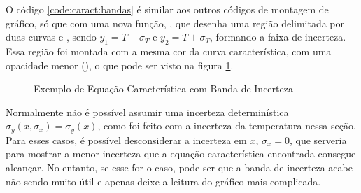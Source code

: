     O código \ref{code:caract:bandas} é similar aos outros códigos de montagem de gráfico, só que com uma nova função, , que desenha uma região delimitada por duas curvas  e , sendo $y_1 = T - \sigma_T$ e $y_2 = T + \sigma_T$, formando a faixa de incerteza. Essa região foi montada com a mesma cor da curva característica, com uma opacidade menor (), o que pode ser visto na figura \ref{fig:caract:bandas}.

    \begin{figure}[H]
        \centering
        

        \caption{Exemplo de Equação Característica com Banda de Incerteza}
        \label{fig:caract:bandas}
    \end{figure}

    \begin{nota}
        Normalmente não é possível assumir uma incerteza determinística $\sigma_y(x, \sigma_x) = \sigma_y(x)$, como foi feito com a incerteza da temperatura nessa seção. Para esses casos, é possível desconsiderar a incerteza em $x$, $\sigma_x = 0$, que serveria para mostrar a menor incerteza que a equação característica encontrada consegue alcançar. No entanto, se esse for o caso, pode ser que a banda de incerteza acabe não sendo muito útil e apenas deixe a leitura do gráfico mais complicada.
    \end{nota}
